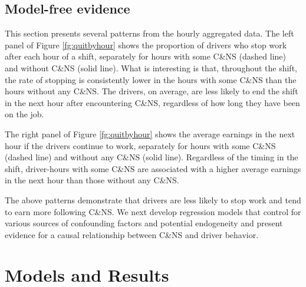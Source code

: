 \documentclass[reviewmode,AEJ]{AEA}
\begin{document}
\subsection{Model-free evidence}
This section presents several patterns from the hourly aggregated data. %
The left panel of Figure \ref{fg:quitbyhour}
shows the proportion of drivers who stop work after each hour of a shift, separately for
hours with some C\&NS (dashed line) and without C\&NS (solid line).
What is interesting is that, throughout the shift, the rate of stopping is consistently lower in the hours with some C\&NS than the hours without any C\&NS. The drivers, on average, are less likely to end the shift in the next hour after encountering C\&NS, regardless of how long they have been on the job.

The right panel of Figure \ref{fg:quitbyhour} shows the average earnings in the next hour if the drivers continue to work, separately for hours with some C\&NS (dashed line) and without any C\&NS (solid line).
Regardless of the timing in the shift, driver-hours with some C\&NS are associated with a higher average earnings in the next hour than those without any C\&NS.


The above patterns demonstrate %
that drivers are less likely to stop work and tend to earn more following C\&NS. %
We next develop regression models  that control for various sources of confounding factors and
potential endogeneity and present evidence for a causal relationship between C\&NS and driver behavior.

\section{Models and Results}
\label{sec:main}
\end{document}
